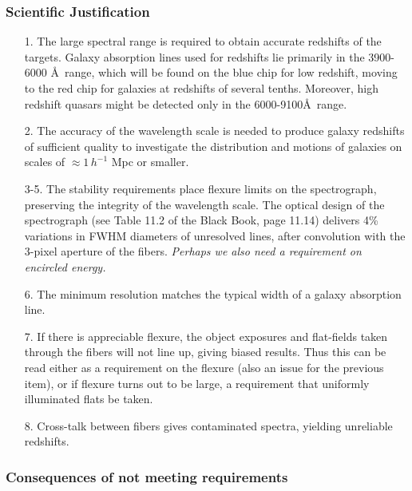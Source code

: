 \subsubsection{Scientific Justification}
\begin{enumerate} 
\item[1.] The large spectral range is required to obtain accurate redshifts of
the targets.  Galaxy absorption lines used for redshifts
   lie primarily in the 3900-6000 \AA\ range, which will be found on
the blue chip for low redshift, moving to the red chip for galaxies at
redshifts of several tenths.  Moreover, high redshift quasars
   might be detected only in the 6000-9100\AA\ range.

\item[2.] The accuracy of the wavelength scale is needed to produce galaxy
redshifts of sufficient quality to investigate the distribution and
motions of galaxies on scales of $\approx 1\,h^{-1}$ Mpc or smaller. 

\item[3-5.] The stability requirements place flexure limits on the
spectrograph, preserving the integrity of the wavelength scale.  The
optical design of the spectrograph (see Table 11.2 of the Black Book,
page 11.14) delivers 4\% variations in FWHM diameters of unresolved
lines, after convolution with the 3-pixel aperture of the fibers. 
{\it Perhaps we also need a requirement on encircled energy.}

\item[6.] The minimum resolution matches the typical width of a galaxy
   absorption line. 

\item[7.] If there is appreciable flexure, the object exposures and
flat-fields taken through the fibers will not line up, giving biased
results.  Thus this can be read either as a requirement on the
flexure (also an issue for the previous item), or if flexure turns out
to be large, a requirement that uniformly illuminated flats be taken. 

\item[8.] Cross-talk between fibers gives contaminated spectra, yielding
unreliable redshifts. 

\end{enumerate}

\subsubsection{Consequences of not meeting requirements}

